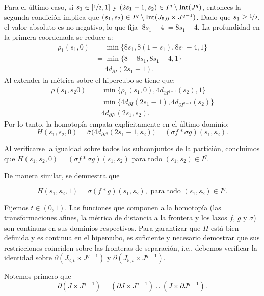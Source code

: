 \begin{dem}
    Para el último caso, si $s_1 \in [\nicefrac{1}{2}, 1]$ y $(2s_1 - 1, s_2) \in I^q \setminus \mathrm{Int}(J^q)$, entonces la segunda condición implica que $(s_1, s_2) \in  I^q\setminus \mathrm{Int}(J_{5,0} \times J^{q-1})$. Dado que $s_1 \geq \nicefrac{1}{2}$, el valor absoluto es no negativo, lo que fija $|8s_1 - 4| = 8s_1 - 4$. La profundidad en la primera coordenada se reduce a:
    \begin{align*}
        \rho_1(s_1, 0) &= \min\big\{8s_1, 8(1-s_1), 8s_1-4, 1\big\} \\
        &= \min\big\{8-8s_1, 8s_1-4, 1\big\} \\
        &= 4d_{\partial I}(2s_1-1).
    \end{align*}
    Al extender la métrica sobre el hipercubo se tiene que:
    \begin{align*}
        \rho(s_1,s_2 0)&= \min\big\{\rho_1(s_1,0), 4d_{\partial I^{q-1}}(s_2), 1\big\} \\
        &=\min\big\{4d_{\partial I}(2s_1-1), 4d_{\partial I^{q-1}}(s_2)\big\} \\
        &= 4d_{\partial I^q}(2s_1, s_2).
    \end{align*}
    Por lo tanto, la homotopía empata explícitamente en el último dominio:
    \[
        H(s_1, s_2, 0) = \overline{\sigma}\big(4d_{\partial I^q}(2s_1-1, s_2)\big) = (\sigma f * \sigma g)(s_1, s_2).
    \]

    \medskip
    Al verificarse la igualdad sobre todos los subconjuntos de la partición, concluimos que $H(s_1, s_2, 0) = (\sigma f * \sigma g)(s_1, s_2)$ para todo $(s_1, s_2) \in I^q$.

    De manera similar, se demuestra que

    \begin{equation*}
        H(s_1,s_2,1)=\sigma(f*g)(s_1,s_2), \text{ para todo } (s_1,s_2)\in I^q.
    \end{equation*}

    Fijemos $t \in (0,1)$. Las funciones que componen a la homotopía (las transformaciones afines, la métrica de distancia a la frontera y los lazos $f$, $g$ y $\overline{\sigma}$) son continuas en sus dominios respectivos. Para garantizar que $H$ está bien definida y es continua en el hipercubo, es suficiente y necesario demostrar que sus restricciones coinciden sobre las fronteras de separación, i.e., debemos verificar la identidad sobre $\partial(J_{2,t} \times J^{q-1})$ y $\partial(J_{5,t} \times J^{q-1})$.

    Notemos primero que
    \[
        \partial(J \times J^{q-1}) = (\partial J \times J^{q-1}) \cup (J \times \partial J^{q-1}).
    \] 


\end{dem}
